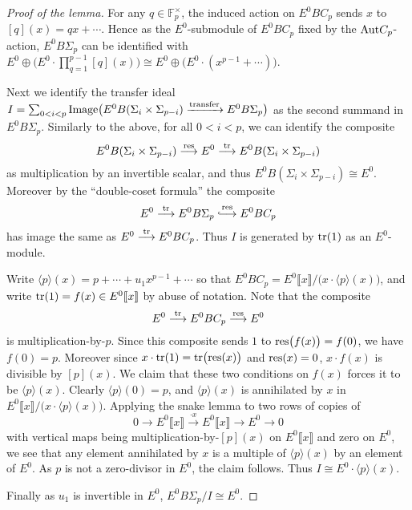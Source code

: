 \documentclass{gtpart}
\theoremstyle{definition}
\theoremstyle{remark}
\newcommand{\mb}[1]{\mathbb{#1}}
\newcommand*{\longhookrightarrow}{\ensuremath{\lhook\joinrel\relbar\joinrel\rightarrow}}
\begin{document}
\begin{proof}[Proof of the lemma]
 For any $q \in {\mb F}_p^\times$, the induced action on $E^0 BC_p$ sends $x$ 
 to $[q](x) = q x + \cdots$.  Hence as the $E^0$-submodule of $E^0 BC_p$ fixed 
 by the ${\rm Aut} C_p$-action, $E^0 B\Sigma_p$ can be identified with 
 $E^0 \oplus \big(E^0 \cdot \prod_{q=1}^{p-1} [q](x)\big) \cong 
 E^0 \oplus \big(E^0 \cdot (x^{p-1} + \cdots)\big)$.  

 Next we identify the transfer ideal $I = \sum_{0<i<p} 
 {\rm Image}\big(E^0 B(\Sigma_i\times\Sigma_{p-i}) 
 \xrightarrow{\rm transfer} E^0 B\Sigma_{p}\big)$ as the second summand in 
 $E^0 B\Sigma_p$.  Similarly to the above, for all $0 < i < p$, we can 
 identify the composite 
 \[
  E^0 B(\Sigma_i \times \Sigma_{p-i}) \stackrel{\rm res}{\longrightarrow} 
  E^0 \stackrel{\rm tr}{\longrightarrow} 
  E^0 B(\Sigma_i \times \Sigma_{p-i}) 
 \]
 as multiplication by an invertible scalar, and thus 
 $E^0 B(\Sigma_i \times \Sigma_{p-i}) \cong E^0$.  Moreover by the 
 ``double-coset formula'' the composite 
 \[
  E^0 \stackrel{\rm tr}{\longrightarrow} E^0 B\Sigma_p 
  \stackrel{\rm res}{\longhookrightarrow} E^0 BC_p 
 \]
 has image the same as $E^0 \stackrel{\rm tr}{\longrightarrow} E^0 BC_p$.  
 Thus $I$ is generated by ${\rm tr}(1)$ as an $E^0$-module.  

 Write $\langle p \rangle(x) = p + \cdots + u_1 x^{p-1} + \cdots$ so that 
 $E^0 BC_p = E^0 \llbracket x \rrbracket / 
 \big( x \cdot \langle p \rangle(x) \big)$, and write ${\rm tr}(1) = 
 f(x) \in E^0 \llbracket x \rrbracket$ by abuse of notation.  Note that the 
 composite 
 \[
  E^0 \stackrel{\rm tr}{\longrightarrow} E^0 BC_p 
  \stackrel{\rm res}{\longrightarrow} E^0 
 \]
 is multiplication-by-$p$.  Since this composite sends $1$ to 
 ${\rm res}\big( f(x) \big) = f(0)$, we have $f(0) = p$.  Moreover since 
 $x \cdot {\rm tr}(1) = {\rm tr}\big( {\rm res}(x) \big)$ and 
 ${\rm res}(x) = 0$, $x \cdot f(x)$ is divisible by $[p](x)$.  We claim that 
 these two conditions on $f(x)$ forces it to be $\langle p \rangle (x)$.  
 Clearly $\langle p \rangle(0) = p$, and $\langle p \rangle(x)$ is annihilated 
 by $x$ in $E^0 \llbracket x \rrbracket / 
 \big( x \cdot \langle p \rangle(x) \big)$.  Applying the snake lemma to two 
 rows of copies of 
 \[
  0 \longrightarrow E^0 \llbracket x \rrbracket 
  \stackrel{\cdot x}{\longrightarrow} E^0 \llbracket x \rrbracket 
  \longrightarrow E^0 \longrightarrow 0 
 \]
 with vertical maps being multiplication-by-$[p](x)$ on 
 $E^0 \llbracket x \rrbracket$ and zero on $E^0$, we see that any element 
 annihilated by $x$ is a multiple of $\langle p \rangle(x)$ by an element of 
 $E^0$.  As $p$ is not a zero-divisor in $E^0$, the claim follows.  Thus 
 $I \cong E^0 \cdot \langle p \rangle(x)$.  

 Finally as $u_1$ is invertible in $E^0$, $E^0 B\Sigma_p/I \cong E^0$.  
\end{proof}
\end{document}
